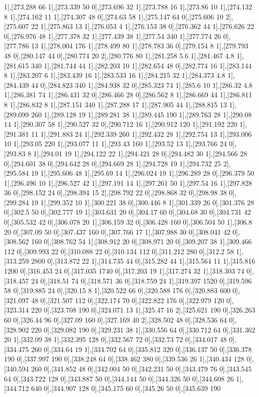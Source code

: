 {1],[273.288 66 1],[273.339 50 0],[273.696 32 1],[273.788 16 1],[273.86 10 1],[274.132 8 1],[274.162 11 1],[274.307 48 0],[274.63 58 1],[275.147 64 0],[275.606 10 2],[275.607 22 1],[275.863 13 1],[276.053 4 1],[276.153 38 0],[276.362 44 1],[276.626 22 0],[276.976 48 1],[277.378 32 1],[277.439 38 1],[277.54 340 1],[277.774 26 0],[277.786 13 1],[278.004 176 1],[278.499 80 1],[278.783 36 0],[279.154 8 1],[279.793 48 0],[280.147 44 0],[280.774 20 2],[280.776 80 1],[281.258 5.6 1],[281.467 4.8 1],[281.615 340 1],[281.744 44 1],[282.203 10 1],[282.654 48 0],[282.774 16 1],[283.144 8 1],[283.207 6 1],[283.439 16 1],[283.533 16 1],[284.215 32 1],[284.373 4.8 1],[284.439 44 0],[284.823 340 1],[284.938 32 0],[285.323 74 1],[285.6 10 1],[286.32 4.8 1],[286.381 74 1],[286.431 32 0],[286.466 28 0],[286.562 8 1],[286.669 44 1],[286.811 8 1],[286.832 8 1],[287.151 340 1],[287.288 17 1],[287.905 44 1],[288.815 13 1],[289.099 260 1],[289.128 19 1],[289.281 38 1],[289.445 190 1],[289.763 28 1],[290.08 14 1],[290.307 58 1],[290.527 32 0],[290.712 16 1],[290.912 120 1],[291.192 220 1],[291.381 11 1],[291.883 24 1],[292.339 260 1],[292.432 28 1],[292.754 13 1],[293.006 10 1],[293.05 220 1],[293.077 11 1],[293.43 160 1],[293.52 13 1],[293.766 24 0],[293.83 8 1],[294.01 19 1],[294.122 22 1],[294.421 28 0],[294.482 30 1],[294.566 28 0],[294.601 38 0],[294.642 28 0],[294.669 28 1],[294.728 19 1],[294.732 25 2],[295.584 19 1],[295.606 48 1],[295.69 14 1],[296.024 19 1],[296.289 28 0],[296.379 50 1],[296.496 10 1],[296.527 42 1],[297.191 14 1],[297.261 50 1],[297.54 16 1],[297.828 36 0],[298.152 24 0],[298.394 15 2],[298.792 22 0],[298.868 32 0],[298.98 38 0],[299.284 19 1],[299.352 10 1],[300.221 38 0],[300.446 8 1],[301.339 26 0],[301.376 28 0],[302.5 50 0],[302.777 19 1],[303.631 20 0],[304.17 60 0],[304.68 30 0],[304.731 42 0],[305.532 42 0],[306.078 20 1],[306.159 32 0],[306.428 160 0],[306.504 50 1],[306.8 20 0],[307.09 50 0],[307.437 160 0],[307.766 17 1],[307.988 30 0],[308.041 42 0],[308.562 160 0],[308.762 54 1],[308.912 20 0],[308.971 20 0],[309.207 38 1],[309.466 112 0],[309.993 22 0],[310.088 22 0],[310.134 112 0],[311.212 280 0],[312.2 58 1],[313.259 2800 0],[313.872 22 1],[314.735 44 0],[315.282 44 1],[315.564 11 1],[315.816 1200 0],[316.453 24 0],[317.035 1740 0],[317.203 19 1],[317.274 32 1],[318.303 74 0],[318.457 24 0],[318.51 74 0],[318.571 36 0],[318.759 24 1],[319.397 1520 0],[319.596 58 0],[319.885 24 0],[320.15 8 1],[320.522 66 0],[320.588 176 0],[320.883 600 0],[321.097 48 0],[321.507 112 0],[322.174 70 0],[322.822 176 0],[322.979 120 0],[323.314 220 0],[323.708 190 0],[324.071 13 1],[325.47 16 2],[325.621 190 0],[326.263 60 0],[326.44 96 0],[327.09 160 0],[327.169 40 2],[328.502 48 0],[328.536 64 0],[328.902 220 0],[329.082 190 0],[329.231 38 1],[330.556 64 0],[330.712 64 0],[331.362 20 1],[332.09 38 1],[332.395 128 0],[332.567 72 0],[332.73 72 0],[334.017 48 0],[334.475 260 0],[334.64 19 1],[334.702 64 0],[335.812 320 0],[336.137 50 0],[336.378 190 0],[337.997 190 0],[338.248 64 0],[338.462 380 0],[339.536 26 1],[340.434 128 0],[340.594 260 0],[341.852 48 0],[342.004 50 0],[342.231 50 0],[343.479 76 0],[343.545 64 0],[343.722 128 0],[343.887 50 0],[344.144 50 0],[344.326 50 0],[344.608 26 1],[344.712 640 0],[344.907 128 0],[345.175 60 0],[345.26 50 0],[345.639 190 }

